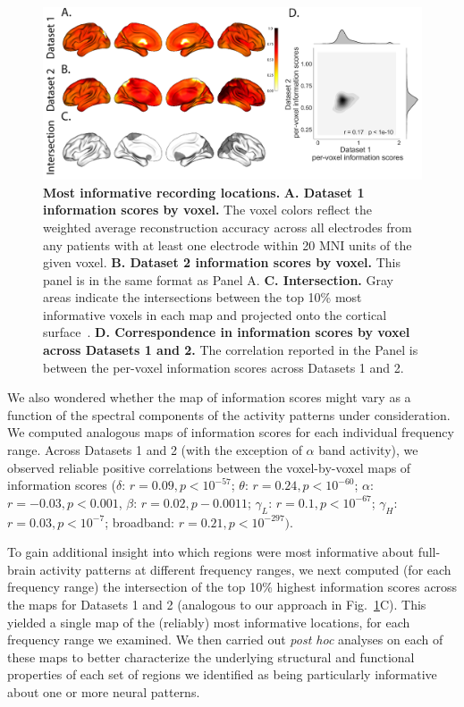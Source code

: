\documentclass[11pt]{article}
\begin{document}
\begin{figure}
  \centering \includegraphics[width=\textwidth]{figs/informap}
  \caption{\textbf{Most informative recording locations.} \textbf{A. Dataset 1
  information scores by voxel.} The voxel colors reflect the weighted average
  reconstruction accuracy across all electrodes from any patients with at least
  one electrode within 20 MNI units of the given voxel.  \textbf{B. Dataset 2
  information scores by voxel.}  This panel is in the same format as Panel A.
  \textbf{C. Intersection.} Gray areas indicate the intersections between the
  top 10\% most informative voxels in each map and projected onto the cortical
  surface~\citep{CombEtal19}. \textbf{D. Correspondence in information scores by
  voxel across Datasets 1 and 2.}  The correlation reported in the Panel is
  between the per-voxel information scores across Datasets 1 and 2.}
  \label{fig:informap}
\end{figure}

We also wondered whether the map of information scores might vary as a function
of the spectral components of the activity patterns under consideration.  We
computed analogous maps of information scores for each individual frequency
range. Across Datasets 1 and 2 (with the exception of $\alpha$ band activity),
we observed reliable positive correlations between the voxel-by-voxel maps of
information scores ($\delta$: $r = 0.09, p < 10^{-57}$; $\theta$: $r = 0.24, p <
10^{-60}$; $\alpha$: $r = -0.03, p < 0.001$, $\beta$: $r = 0.02, p - 0.0011$;
$\gamma_L$: $r = 0.1, p < 10^{-67}$; $\gamma_H$: $r = 0.03, p < 10^{-7}$;
broadband: $r = 0.21, p < 10^{-297})$.

To gain additional insight into which regions were most informative about
full-brain activity patterns at different frequency ranges, we next computed
(for each frequency range) the intersection of the top 10\% highest information
scores across the maps for Datasets 1 and 2 (analogous to our approach in
Fig.~\ref{fig:informap}C). This yielded a single map of the (reliably) most
informative locations, for each frequency range we examined. We then carried out
\textit{post hoc} analyses on each of these maps to better characterize the
underlying structural and functional properties of each set of regions we
identified as being particularly informative about one or more neural patterns.
\end{document}
